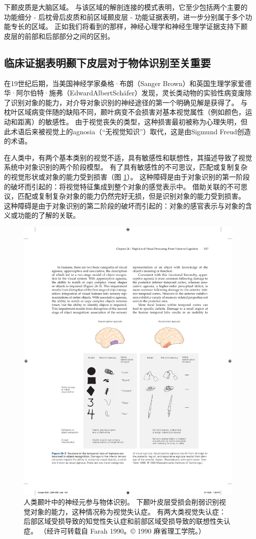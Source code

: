 下颞皮质是大脑区域。 
与该区域的解剖连接的模式表明，它至少包括两个主要的功能细分 - 后枕骨后皮质和前区域颞皮层 - 功能证据表明，进一步分别属于多个功能专长的区域。 
正如我们将看到的那样，神经心理学和神经生理学证据支持下颞皮层的前部和后部部分之间的区别。



\subsection{临床证据表明颞下皮层对于物体识别至关重要}

在19世纪后期，当美国神经学家桑格·布朗（Sanger Brown）和英国生理学家爱德华·阿尔伯特·施弗（EdwardAlbertSchäfer）发现，灵长类动物的实验性病变废除了识别对象的能力，对介导对象识别的神经途径的第一个明确见解是获得了。 
与枕叶区域病变伴随的缺陷不同，颞叶病变不会损害对基本视觉属性（例如颜色，运动和距离）的敏感性。 
由于视觉丧失的类型，这种损害最初被称为心理失明，但此术语后来被视觉上的agnosia（“无视觉知识”）取代，这是由Sigmund Freud创造的术语。


在人类中，有两个基本类别的视觉不适，具有敏感性和联想性，其描述导致了视觉系统中对象识别的两个阶段模型。
有了具有敏感性的不可思议，匹配或复制复杂的视觉形状或对象的能力受到损害（图 \ref{fig:24_3}）。
这种障碍是由于对象识别的第一阶段的破坏而引起的：将视觉特征集成到整个对象的感觉表示中。 
借助关联的不可思议，匹配或复制复杂对象的能力仍然完好无损，但是识别对象的能力受到损害。
这种障碍是由于对象识别的第二阶段的破坏而引起的：对象的感官表示与对象的含义或功能的了解的关联。


\begin{figure}[htbp]
	\centering
	\includegraphics[width=0.8\linewidth]{chap24/fig_24_3}
	\caption{人类颞叶中的神经元参与物体识别。 下颞叶皮层受损会削弱识别视觉对象的能力，这种情况称为视觉失认症。 有两大类视觉失认症：后部区域受损导致的知觉性失认症和前部区域受损导致的联想性失认症。 （经许可转载自 Farah 1990。© 1990 麻省理工学院。）}
	\label{fig:24_3}
\end{figure}


